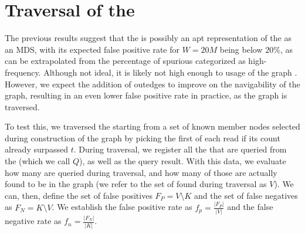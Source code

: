 
\section{Traversal of the \dBCM}
\label{sec:results-dbcm-traversal}

The previous results suggest that the \dBCM is possibly an apt representation of the \dBG as an MDS, with its expected false positive rate for $W = 20M$ being below $20\%$, as can be extrapolated from the percentage of spurious  categorized as high-frequency. Although not ideal, it is likely not high enough to  usage of the graph \cite{Pell2012}. However, we expect the addition of outedges to improve on the navigability of the graph, resulting in an even lower false positive rate in practice, as the graph is traversed.

To test this, we traversed the \dBCM starting from a set of known member nodes selected during construction of the graph by picking the first \kmer of each read if its count already surpassed $t$. During traversal, we register all the  that are queried from the \dBCM (which we call $Q$), as well as the query result. With this data, we evaluate how many  are queried during traversal, and how many of those are actually found to be in the graph (we refer to the set of  found during traversal as $V$). We can, then, define the set of false positives $F_P = V \setminus K$ and the set of false negatives as $F_N = K \setminus V$. We establish the false positive rate as $f_p = \frac{|F_P|}{|V|}$ and the false negative rate as $f_n = \frac{|F_N|}{|K|}$.



